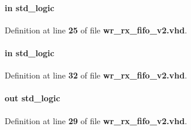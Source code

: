 \paragraph[{en}]{ {\bfseries \textcolor{keywordflow}{in}\textcolor{vhdlchar}{ }} {\bfseries \textcolor{comment}{std\+\_\+logic}\textcolor{vhdlchar}{ }} \hspace{0.3cm}{\ttfamily [Port]}}\label{classwr__rx__fifo__v2_adcf9c6f5161d039addbda5819bee64a3}


Definition at line {\bf 25} of file {\bf wr\+\_\+rx\+\_\+fifo\+\_\+v2.\+vhd}.

\paragraph[{fifo\+\_\+wfull}]{ {\bfseries \textcolor{keywordflow}{in}\textcolor{vhdlchar}{ }} {\bfseries \textcolor{comment}{std\+\_\+logic}\textcolor{vhdlchar}{ }} \hspace{0.3cm}{\ttfamily [Port]}}\label{classwr__rx__fifo__v2_a63de1b8160d1ffec718f19920aa9a2a1}


Definition at line {\bf 32} of file {\bf wr\+\_\+rx\+\_\+fifo\+\_\+v2.\+vhd}.

\paragraph[{fifo\+\_\+wr}]{ {\bfseries \textcolor{keywordflow}{out}\textcolor{vhdlchar}{ }} {\bfseries \textcolor{comment}{std\+\_\+logic}\textcolor{vhdlchar}{ }} \hspace{0.3cm}{\ttfamily [Port]}}\label{classwr__rx__fifo__v2_abad7153eeefd341545091d5d2b698cf5}


Definition at line {\bf 29} of file {\bf wr\+\_\+rx\+\_\+fifo\+\_\+v2.\+vhd}.

